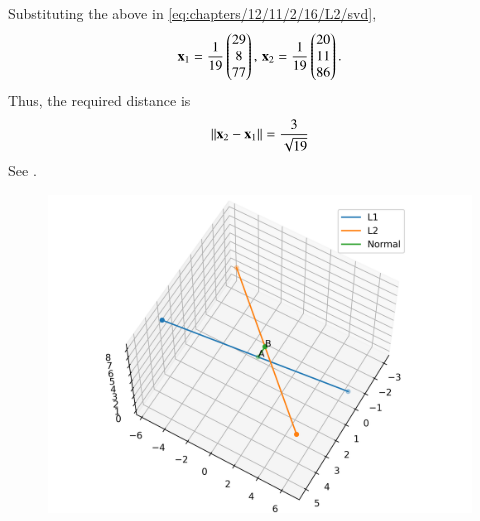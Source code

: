         Substituting the above in \eqref{eq:chapters/12/11/2/16/L2/svd},
    \begin{align}
        \mathbf{x}_1 = \frac{1}{19}\begin{pmatrix}29\\8\\77\end{pmatrix},\, \mathbf{x}_2 = \frac{1}{19}\begin{pmatrix}20\\11\\86\end{pmatrix}.
    \end{align}
    Thus, the required distance is
    \begin{align}
        \left\lVert\mathbf{x}_2-\mathbf{x}_1\right\rVert = \frac{3}{\sqrt{19}}
    \end{align}
See .
    \begin{figure}[!ht]
        \centering
        \includegraphics[width=\columnwidth]{chapters/12/11/2/16/lsq/figs/skew.png}
        \caption{}
        \label{fig:chapters/12/11/2/16/skew}
    \end{figure}
